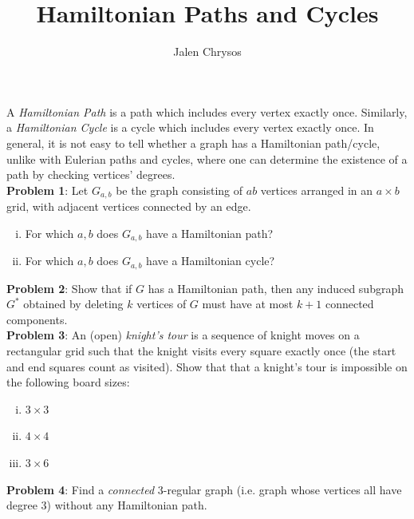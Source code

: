 \documentclass{amsart}
\author{Jalen Chrysos}
\title{Hamiltonian Paths and Cycles}
\begin{document}
	
	\maketitle 
	
	A \textit{Hamiltonian Path} is a path which includes every vertex exactly once. Similarly, a \textit{Hamiltonian Cycle} is a cycle which includes every vertex exactly once. In general, it is not easy to tell whether a graph has a Hamiltonian path/cycle, unlike with Eulerian paths and cycles, where one can determine the existence of a path by checking vertices' degrees.\\
	
	\noindent \textbf{Problem 1}: Let $G_{a,b}$ be the graph consisting of $ab$ vertices arranged in an $a\times b$ grid, with adjacent vertices connected by an edge. 
	\begin{enumerate}[(i)]
		\item For which $a,b$ does $G_{a,b}$ have a Hamiltonian path?
		\item For which $a,b$ does $G_{a,b}$ have a Hamiltonian cycle?\\
	\end{enumerate}
	
%	
	
	\noindent \textbf{Problem 2}: Show that if $G$ has a Hamiltonian path, then any induced subgraph $G^*$ obtained by deleting $k$ vertices of $G$ must have at most $k+1$ connected components.\\
	
	\noindent \textbf{Problem 3}: An (open) \textit{knight's tour} is a sequence of knight moves on a rectangular grid such that the knight visits every square exactly once (the start and end squares count as visited). Show that that a knight's tour is impossible on the following board sizes:
	\begin{enumerate}[(i)]
		\item $3\times 3$
		\item $4\times 4$
		\item $3\times 6$\\
	\end{enumerate}
	
	\noindent \textbf{Problem 4}: Find a \textit{connected} 3-regular graph (i.e. graph whose vertices all have degree 3) without any Hamiltonian path.\\
	
\end{document}
